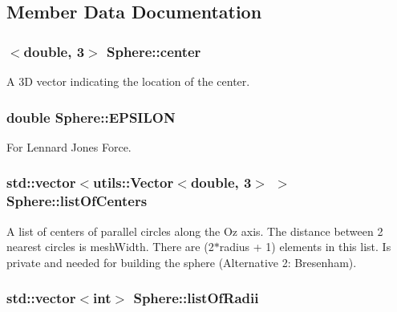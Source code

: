 \subsection{Member Data Documentation}
\hypertarget{classSphere_a23d3e7709e2cabae2608d470a1edcece}{
\subsubsection[{center}]{$<$double, 3$>$ Sphere\-::center\hspace{0.3cm}{\ttfamily [private]}}}\label{classSphere_a23d3e7709e2cabae2608d470a1edcece}
A 3\-D vector indicating the location of the center. \hypertarget{classSphere_ada633ebd567ecc2c88b9e31d7de8fc31}{
\subsubsection[{E\-P\-S\-I\-L\-O\-N}]{\setlength{\rightskip}{0pt plus 5cm}double Sphere\-::\-E\-P\-S\-I\-L\-O\-N\hspace{0.3cm}{\ttfamily [private]}}}\label{classSphere_ada633ebd567ecc2c88b9e31d7de8fc31}
For Lennard Jones Force. \hypertarget{classSphere_a9c74234600792e31954bcbf58e692b95}{
\subsubsection[{list\-Of\-Centers}]{\setlength{\rightskip}{0pt plus 5cm}std\-::vector$<${\bf utils\-::\-Vector}$<$double, 3$>$ $>$ Sphere\-::list\-Of\-Centers\hspace{0.3cm}{\ttfamily [private]}}}\label{classSphere_a9c74234600792e31954bcbf58e692b95}
A list of centers of parallel circles along the Oz axis. The distance between 2 nearest circles is mesh\-Width. There are (2$\ast$radius + 1) elements in this list. Is private and needed for building the sphere (Alternative 2\-: Bresenham). \hypertarget{classSphere_a97986825b799049cdc4ffbe535e23200}{
\subsubsection[{list\-Of\-Radii}]{\setlength{\rightskip}{0pt plus 5cm}std\-::vector$<$int$>$ Sphere\-::list\-Of\-Radii\hspace{0.3cm}{\ttfamily [private]}}}\label{classSphere_a97986825b799049cdc4ffbe535e23200}
